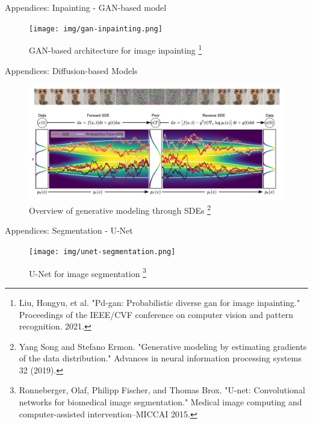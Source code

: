 




\begin{frame}{Appendices: Inpainting - GAN-based model}
    \begin{figure}
        \centering
        \texttt{[image: img/gan-inpainting.png]}
        \caption{GAN-based architecture for image inpainting \footnote{Liu, Hongyu, et al. "Pd-gan: Probabilistic diverse gan for image inpainting." Proceedings of the IEEE/CVF conference on computer vision and pattern recognition. 2021.}}
        \label{fig:enter-label}
    \end{figure}
\end{frame}

\begin{frame}{Appendices: Diffusion-based Models}
    \begin{figure}
        \centering
        \includegraphics[width=0.85\linewidth]{diffusion.png}
        \caption{Overview of generative modeling through SDEs \footnote{\scriptsize Yang Song and Stefano Ermon. "Generative modeling by estimating gradients of the data distribution." Advances in neural information processing systems 32 (2019).}}  
    \end{figure}
\end{frame}

\begin{frame}{Appendices: Segmentation - U-Net}
    \begin{figure}
        \centering
        \texttt{[image: img/unet-segmentation.png]}
        \caption{U-Net for image segmentation \footnote{Ronneberger, Olaf, Philipp Fischer, and Thomas Brox. "U-net: Convolutional networks for biomedical image segmentation." Medical image computing and computer-assisted intervention–MICCAI 2015.}}
        \label{fig:enter-label}
    \end{figure}
\end{frame}

